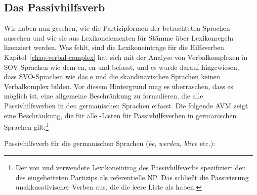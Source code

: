 
\subsection{Das Passivhilfsverb}
\label{sec-auxiliary}

Wir haben nun gesehen, wie die Partizipformen der betrachteten Sprachen aussehen und wie sie
aus Lexikonelementen für Stämme über Lexikonregeln lizenziert werden. Was fehlt, sind die Lexikoneinträge für die
Hilfsverben. Kapitel~\ref{chap-verbal-complex} hat sich mit der Analyse von Verbalkomplexen in SOV-Sprachen wie
dem en, en und  befasst, und es wurde darauf hingewiesen, dass SVO-Sprachen wie das e und die
skandinavischen Sprachen keinen Verbalkomplex bilden. Vor diesem Hintergrund mag es überraschen,
dass es möglich ist, eine allgemeine Beschränkung zu formulieren, die alle Passivhilfsverben in den
germanischen Sprachen erfasst. Die folgende AVM zeigt eine Beschränkung, die für alle \argst-Listen für Passivhilfsverben in germanischen Sprachen gilt:\footnote{%
Der von \citet[]{Mueller2002b} und \citet[]{MOe2013a} verwendete Lexikoneintrag des Passivhilfsverbs
spezifiziert den \daw des eingebetteten Partizips als referentielle NP. Das schließt die
Passivierung unakkusativischer Verben aus, die die leere Liste als \daw haben.
}
 
\ea
\label{le-passive-aux-arg-st}%
Passivhilfsverb für die germanischen Sprachen (\emph{be}, \emph{werden}, \emph{blive} etc.):\\
\z
%

